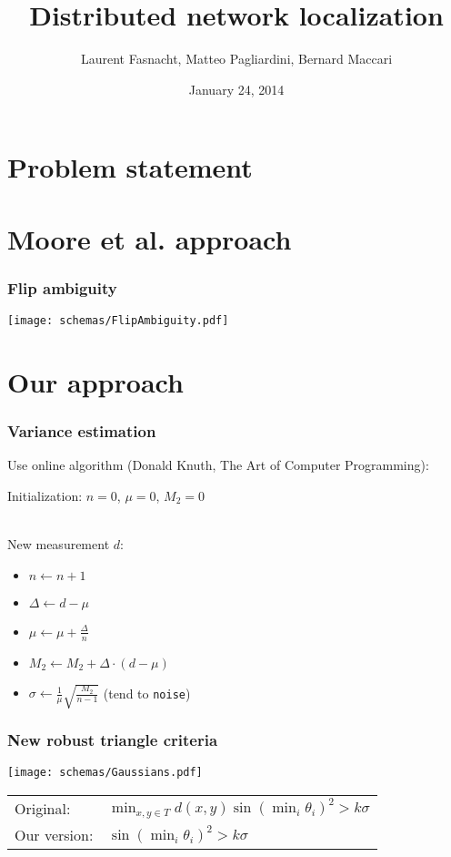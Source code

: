 \documentclass{beamer}
\title{Distributed network localization}
\author{Laurent Fasnacht, Matteo Pagliardini, Bernard Maccari}
\institute{Distributed Intelligent Systems}
\date{January 24, 2014}
\begin{document}
\begin{frame}
  \titlepage
\end{frame}

\section{Problem statement}
\section{Moore et al. approach}

\begin{frame}
    \frametitle{Flip ambiguity}
    \texttt{[image: schemas/FlipAmbiguity.pdf]}
\end{frame}

\section{Our approach}
\begin{frame}
    \frametitle{Variance estimation}
    
    Use online algorithm (Donald Knuth, The Art of Computer Programming):
    
    Initialization: $n = 0$, $\mu = 0$, $M_2 = 0$ \\~
    
    New measurement $d$:
    \begin{itemize}
        \item $n \gets n+1$
        \item $\Delta \gets d - \mu$
        \item $\mu \gets \mu + \frac{\Delta}{n}$
        \item $M_2 \gets M_2 + \Delta \cdot (d-\mu)$
        \item $\sigma \gets \frac{1}{\mu}\sqrt{\frac{M_2}{n - 1}}$ (tend to \texttt{noise})
    \end{itemize}
\end{frame}

\begin{frame}
    \frametitle{New robust triangle criteria}
    \texttt{[image: schemas/Gaussians.pdf]}
    
    \begin{tabular}{ll}
        Original: &  $\min_{x,y \in T} d(x,y) \sin(\min_i \theta_i)^2 > k \sigma$ \\
        Our version: & $\sin(\min_i \theta_i)^2 > k \sigma$ \\
    \end{tabular}
\end{frame}
\end{document}
